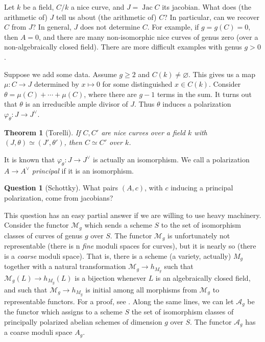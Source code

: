 \documentclass{article}
\DeclareMathOperator{\jac}{Jac}
\newtheorem{theorem}[subsection]{Theorem}
\theoremstyle{definition}
\newtheorem{question}[subsection]{Question}
\begin{document}
Let $k$ be a field, $C/k$ a nice curve, and $J=\jac C$ its jacobian. What does 
(the arithmetic of) $J$ tell us about (the arithmetic of) $C$? In particular, 
can we recover $C$ from $J$? In general, $J$ does not determine $C$. For 
example, if $g=g(C)=0$, then $A=0$, and there are many non-isomorphic nice 
curves of genus zero (over a non-algebraically closed field). There are more 
difficult examples with genus $g>0$. 

Suppose we add some data. Assume $g\geqslant 2$ and $C(k)\ne\varnothing$. This 
gives us a map $\mu:C\to J$ determined by $x\mapsto 0$ for some distinguished 
$x\in C(k)$. Consider $\theta = \mu(C)+\cdots + \mu(C)$, where there are $g-1$ 
terms in the sum. It turns out that $\theta$ is an irreducible ample divisor of 
$J$. Thus $\theta$ induces a polarization $\varphi_\theta:J\to J^\vee$. 

\begin{theorem}[Torelli]
If $C,C'$ are nice curves over a field $k$ with $(J,\theta)\simeq (J',\theta')$, 
then $C\simeq C'$ over $k$. 
\end{theorem}

It is known that $\varphi_\theta:J\to J^\vee$ is actually an isomorphism. We 
call a polarization $A\to A^\vee$ \emph{principal} if it is an isomorphism. 

\begin{question}[Schottky]
What pairs $(A,c)$, with $c$ inducing a principal polarization, come from 
jacobians? 
\end{question}

This question has an easy partial answer if we are willing to use heavy 
machinery. Consider the functor $\mathcal{M}_g$ which sends a scheme $S$ to the 
set of isomorphism classes of curves of genus $g$ over $S$. The functor 
$\mathcal{M}_g$ is unfortunately not representable (there is n 
\emph{fine} moduli spaces for curves), but it is nearly so (there is a 
\emph{coarse} moduli space). That is, there is a scheme (a variety, 
actually) $M_g$ together with a natural transformation 
$\mathcal{M}_g\to h_{M_g}$ such that $\mathcal{M}_g(L)\to h_{M_g}(L)$ is a 
bijection whenever $L$ is an algebraically closed field, and such that 
$\mathcal{M}_g\to h_{M_g}$ is initial among all morphisms from $\mathcal{M}_g$ 
to representable functors. For a proof, see \cite[5]{mu94}. Along the same lines, 
we can let $\mathcal{A}_g$ be the functor which assigns to a scheme $S$ the set 
of isomorphism classes of principally polarized abelian schemes of dimension 
$g$ over $S$. The functor $\mathcal{A}_g$ has a coarse moduli space $A_g$. 
\end{document}
